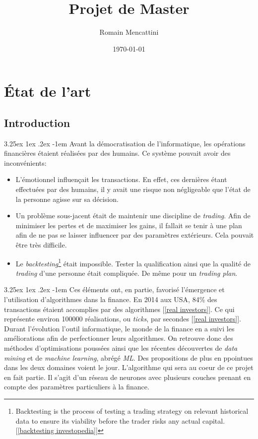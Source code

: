 \documentclass[a4paper, 11pt]{article}
\title{Projet de Master}
\author{Romain Mencattini}
\date{\today}
\makeatletter
\renewcommand\paragraph{\@startsection{paragraph}{5}{\z@}%
  {3.25ex \@plus1ex \@minus.2ex}%
  {-1em}%
  {\normalfont\normalsize\bfseries}}
\makeatother
\begin{document}
\maketitle
\newpage
\tableofcontents
\newpage

\section{État de l'art}
\subsection{Introduction}
\paragraph{}
Avant la démocratisation de l'informatique, les opérations financières étaient réalisées par des humains. Ce système pouvait avoir des inconvénients:
\begin{itemize}
\item L'émotionnel influençait les transactions. En effet, ces dernières étant effectuées par des humains, il y avait une risque non négligeable que l'état de la personne agisse sur sa décision.
\item Un problème sous-jacent était de maintenir une discipline de \textit{trading}. Afin de minimiser les pertes et de maximiser les gains, il fallait se tenir à une plan afin de ne pas se laisser influencer par des paramètres extérieurs. Cela pouvait être très difficile.
\item Le \textit{backtesting}\footnote{Backtesting is the process of testing a trading strategy on relevant historical data to ensure its viability before the trader risks any actual capital. [\ref{backtesting investopedia}]} était impossible. Tester la qualification ainsi que la qualité de \textit{trading} d'une personne était compliquée. De même pour un \textit{trading plan}.
\end{itemize}

\paragraph{}
Ces éléments ont, en partie, favorisé l'émergence et l'utilisation d'algorithmes dans la finance. En 2014 aux USA, 84\% des transactions étaient accomplies par des algorithmes [\ref{real investors}]. Ce qui représente environ 100000 réalisations, ou \textit{ticks}, par secondes [\ref{real investors}].
Durant l'évolution l'outil informatique, le monde de la finance en a suivi les améliorations afin de perfectionner leurs algorithmes.
On retrouve donc des méthodes d'optimisations poussées ainsi que les récentes découvertes de \textit{data mining} et de \textit{machine learning}, abrégé \textit{ML}. Des propositions de plus en ppointues dans les deux domaines voient le jour. L'algorithme qui sera au coeur de ce projet en fait partie. Il s'agit d'un réseau de neurones avec plusieurs couches prenant en compte des paramètres particuliers à la finance.
\end{document}
